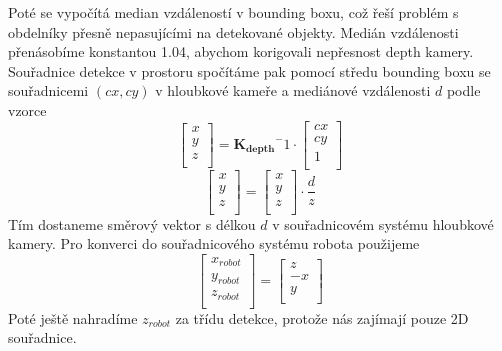 \documentclass[a4paper,12pt]{article}
\begin{document}
Poté se vypočítá median vzdáleností v bounding boxu, což řeší problém s obdelníky přesně nepasujícími na detekované objekty. 
Medián vzdálenosti přenásobíme konstantou 1.04, abychom korigovali nepřesnost depth kamery. Souřadnice detekce v prostoru spočítáme pak pomocí středu bounding boxu se souřadnicemi $(cx,cy)$ v hloubkové kameře a mediánové vzdálenosti $d$ podle vzorce
\begin{equation}
    \begin{bmatrix}
        x \\
        y \\
        z \\
    \end{bmatrix} = 
    \mathbf{K_{depth}}^-1 \cdot \begin{bmatrix}
        cx \\
        cy \\
        1\\
    \end{bmatrix}
\end{equation}
\begin{equation}
    \begin{bmatrix}
        x \\
        y \\
        z \\
    \end{bmatrix} = 
    \begin{bmatrix}
        x \\
        y \\
        z \\
    \end{bmatrix} \cdot \frac{d}{z}
\end{equation}
Tím dostaneme směrový vektor s délkou $d$ v souřadnicovém systému hloubkové kamery. Pro konverci do souřadnicového systému robota použijeme 
\begin{equation}
    \begin{bmatrix}
        x_{robot} \\
        y_{robot} \\
        z_{robot} \\
    \end{bmatrix} = 
    \begin{bmatrix}
        z \\
        -x \\
        y \\
    \end{bmatrix}
\end{equation}
Poté ještě nahradíme $z_{robot}$ za třídu detekce, protože nás zajímají pouze 2D souřadnice.
\end{document}

